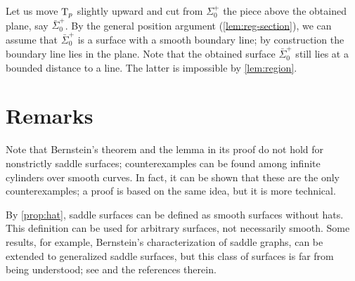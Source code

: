 Let us move $\mathrm{T}_p$ slightly upward and cut from $\Sigma^+_0$ the piece above the obtained plane, say $\bar\Sigma^+_0$.
By the general position argument (\ref{lem:reg-section}),
we can assume that $\bar\Sigma^+_0$ is a surface with a smooth boundary line;
by construction the boundary line lies in the plane.
Note that the obtained surface $\bar\Sigma^+_0$ still lies at a bounded distance to a line.
The latter is impossible by \ref{lem:region}.
\qeds

\section*{Remarks}

Note that Bernstein's theorem and the lemma in its proof do not hold for nonstrictly saddle surfaces;
counterexamples can be found among infinite cylinders over smooth curves.
In fact, it can be shown that these are the only counterexamples;
a proof is based on the same idea, but it is more technical.

By \ref{prop:hat}, saddle surfaces can be defined as smooth surfaces without hats.
This definition can be used for arbitrary surfaces, not necessarily smooth.
Some results, for example, Bernstein's characterization of saddle graphs, can be extended to generalized saddle surfaces, but this class of surfaces is far from being understood; see \cite[Chapter 4]{alexander-kapovitch-petrunin2019} and the references therein.
